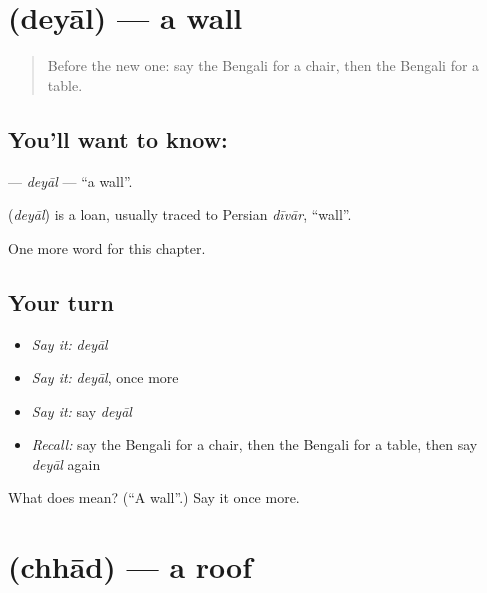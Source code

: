 \section[\texorpdfstring{\bn{দেয়াল} (deyāl)}{দেয়াল (deyāl)}]{ (deyāl) — a wall}

\label{lesson:BN-C60-deyal}



\begin{quote}
Before the new one: say the Bengali for a chair, then the Bengali for a table.
\end{quote}

\subsection*{You'll want to know: }
\textbf{} — \emph{deyāl} — \textquotedblleft{}a wall\textquotedblright{}.

\begin{cousinweb}
\textbf{} (\emph{deyāl}) is a loan, usually traced to Persian \emph{dīvār}, \textquotedblleft{}wall\textquotedblright{}.
\end{cousinweb}

\begin{grammarlens}[title={What you've built}]
One more word for this chapter.
\end{grammarlens}

\subsection*{Your turn}
\begin{itemize}
\raggedright
  \item \emph{Say it:} \emph{deyāl}
  \item \emph{Say it:} \emph{deyāl}, once more
  \item \emph{Say it:} say \emph{deyāl}
  \item \emph{Recall:} say the Bengali for a chair, then the Bengali for a table, then say \emph{deyāl} again
\end{itemize}

\begin{tcolorbox}[breakable,colback=teal!4,colframe=teal!35!black,title={Before you move on}]
What does  mean? (\textquotedblleft{}A wall\textquotedblright{}.) Say it once more.
\end{tcolorbox}
\section[\texorpdfstring{\bn{ছাদ} (chhād)}{ছাদ (chhād)}]{ (chhād) — a roof}

